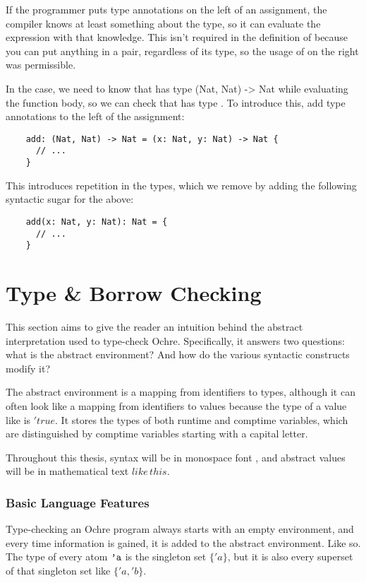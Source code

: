 \documentclass[12pt,twoside]{report}
\begin{document}
If the programmer puts type annotations on the left of an assignment, the compiler knows at least something about the type, so it can evaluate the expression with that knowledge. This isn't required in the definition of  because you can put anything in a pair, regardless of its type, so the usage of  on the right was permissible.

In the  case, we need to know that  has type {(Nat, Nat) -> Nat} while evaluating the function body, so we can check that  has type . To introduce this, add type annotations to the left of the assignment:

  \begin{verbatim}
    add: (Nat, Nat) -> Nat = (x: Nat, y: Nat) -> Nat {
      // ...
    }
  \end{verbatim}

This introduces repetition in the types, which we remove by adding the following syntactic sugar for the above:

  \begin{verbatim}
    add(x: Nat, y: Nat): Nat = {
      // ...
    }
  \end{verbatim}

\cleardoublepage
\section{Type \& Borrow Checking}
\label{section:checkingexample}
This section aims to give the reader an intuition behind the abstract interpretation used to type-check Ochre. Specifically, it answers two questions: what is the abstract environment? And how do the various syntactic constructs modify it?

The abstract environment is a mapping from identifiers to types, although it can often look like a mapping from identifiers to values because the type of a value like  is $'true$. It stores the types of both runtime and comptime variables, which are distinguished by comptime variables starting with a capital letter.

Throughout this thesis, syntax will be in monospace font , and abstract values will be in mathematical text $like\,this$.

\subsubsection{Basic Language Features}
Type-checking an Ochre program always starts with an empty environment, and every time information is gained, it is added to the abstract environment. Like so. The type of every atom $\text{\texttt{'a}}$ is the singleton set $\{'a\}$, but it is also every superset of that singleton set like $\{'a, 'b\}$.
\end{document}

